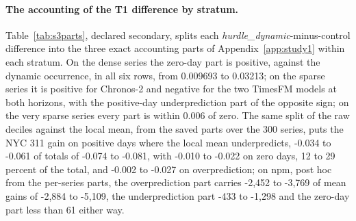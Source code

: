 \paragraph{The accounting of the T1 difference by stratum.} Table~\ref{tab:s3parts}, declared secondary,
splits each \emph{hurdle\_dynamic}-minus-control difference into the three exact accounting parts of
Appendix~\ref{app:study1} within each stratum. On the dense series the zero-day part is positive, against the dynamic occurrence, in all six
rows, from 0.009693 to 0.03213; on the sparse series it is positive for Chronos-2 and negative for the two
TimesFM models at both horizons, with the positive-day underprediction part of the opposite sign; on the very
sparse series every part is within 0.006 of zero. The same split of the raw deciles against the local mean,
from the saved parts over the 300 series, puts the NYC 311 gain on positive days where the local mean
underpredicts, -0.034 to -0.061 of totals of -0.074 to -0.081, with -0.010 to -0.022 on zero days, 12 to 29
percent of the total, and -0.002 to -0.027 on overprediction; on npm, post hoc from the per-series parts, the
overprediction part carries -2,452 to -3,769 of mean gains of -2,884 to -5,109, the underprediction part -433
to -1,298 and the zero-day part less than 61 either way.

